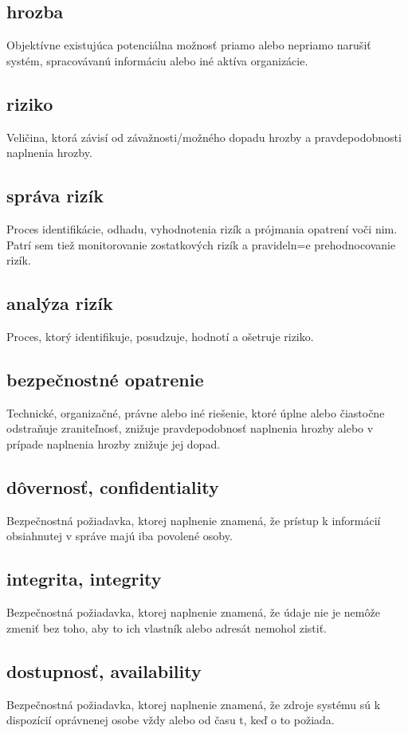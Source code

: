 \subsection*{hrozba}
Objektívne existujúca potenciálna možnosť priamo alebo nepriamo narušiť systém, spracovávanú informáciu alebo iné aktíva organizácie.

\subsection*{riziko}
Veličina, ktorá závisí od závažnosti/možného dopadu hrozby a pravdepodobnosti naplnenia hrozby.

\subsection*{správa rizík}
Proces identifikácie, odhadu,  vyhodnotenia rizík a prójmania opatrení voči nim. Patrí sem tiež monitorovanie zostatkových rizík a
pravideln=e prehodnocovanie rizík.

\subsection*{analýza rizík}
Proces, ktorý identifikuje, posudzuje, hodnotí a ošetruje riziko.

\subsection*{bezpečnostné opatrenie}
Technické, organizačné, právne alebo iné riešenie, ktoré úplne alebo čiastočne odstraňuje zraniteľnosť, znižuje pravdepodobnosť naplnenia hrozby alebo
v prípade naplnenia hrozby znižuje jej dopad.

\subsection*{dôvernosť, confidentiality}
Bezpečnostná požiadavka, ktorej naplnenie znamená, že prístup k informácií obsiahnutej v správe majú iba povolené osoby.

\subsection*{integrita, integrity}
Bezpečnostná požiadavka, ktorej naplnenie znamená, že údaje nie je nemôže zmeniť bez toho, aby to ich vlastník alebo adresát nemohol zistiť.

\subsection*{dostupnosť, availability}
Bezpečnostná požiadavka, ktorej naplnenie znamená, že zdroje systému sú k dispozícií oprávnenej osobe vždy alebo od času t, keď o to požiada.

